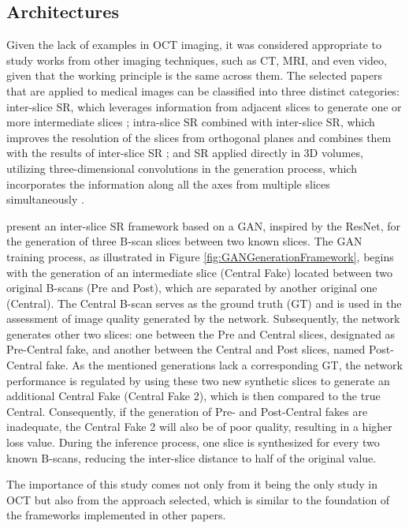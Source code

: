 \subsection{Architectures}
Given the lack of examples in OCT imaging, it was considered appropriate to study works from other imaging techniques, such as CT, MRI, and even video, given that the working principle is the same across them. The selected papers that are applied to medical images can be classified into three distinct categories: inter-slice SR, which leverages information from adjacent slices to generate one or more intermediate slices \parencite{Lopez2023, Xia2021, Wu2022, Nishimoto2024}; intra-slice SR combined with inter-slice SR, which improves the resolution of the slices from orthogonal planes and combines them with the results of inter-slice SR \parencite{Zhang2024, Peng2020, Fang2022, Nimitha2024, Georgescu2020}; and SR applied directly in 3D volumes, utilizing three-dimensional convolutions in the generation process, which incorporates the information along all the axes from multiple slices simultaneously \parencite{YChen2018, Sanchez2018, Kudo2019, Zhang2022}.
\par
\textcite{Lopez2023} present an inter-slice SR framework based on a GAN, inspired by the ResNet, for the generation of three B-scan slices between two known slices. The GAN training process, as illustrated in Figure \ref{fig:GANGenerationFramework}, begins with the generation of an intermediate slice (Central Fake) located between two original B-scans (Pre and Post), which are separated by another original one (Central). The Central B-scan serves as the ground truth (GT) and is used in the assessment of image quality generated by the network. Subsequently, the network generates other two slices: one between the Pre and Central slices, designated as Pre-Central fake, and another between the Central and Post slices, named Post-Central fake. As the mentioned generations lack a corresponding GT, the network performance is regulated by using these two new synthetic slices to generate an additional Central Fake (Central Fake 2), which is then compared to the true Central. Consequently, if the generation of Pre- and Post-Central fakes are inadequate, the Central Fake 2 will also be of poor quality, resulting in a higher loss value. During the inference process, one slice is synthesized for every two known B-scans, reducing the inter-slice distance to half of the original value.
\par
The importance of this study comes not only from it being the only study in OCT but also from the approach selected, which is similar to the foundation of the frameworks implemented in other papers. 

